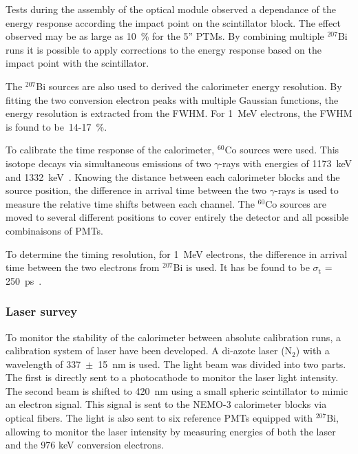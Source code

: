 \documentclass[main.tex]{subfiles}
\begin{document}
\bigskip


\NI Tests during the assembly of the optical module observed a dependance of the energy response according the impact point on the scintillator block. The effect observed may be as large as 10~\% for the 5'' PTMs. By combining multiple $^{\text{207}}$Bi runs it is possible to apply corrections to the energy response based on the impact point with the scintillator.


\bigskip


\NI The $^{\text{207}}$Bi sources are also used to derived the calorimeter energy resolution. By fitting the two conversion electron peaks with multiple Gaussian functions, the energy resolution is extracted from the FWHM. For 1~MeV electrons, the FWHM is found to be~14-17~\%. 
 
 
\bigskip


\NI To calibrate the time response of the calorimeter, $^{\text{60}}$Co sources were used. This isotope decays via simultaneous emissions of two $\gamma$-rays with energies of 1173~keV and 1332~keV~\cite{DecayCo60}. Knowing the distance between each calorimeter blocks and the source position, the difference in arrival time between the two $\gamma$-rays is used to measure the relative time shifts between each channel. The $^{\text{60}}$Co sources are moved to several different positions to cover entirely the detector and all possible combinaisons of PMTs.


\bigskip


\NI To determine the timing resolution, for 1~MeV electrons, the difference in arrival time between the two electrons from $^{\text{207}}$Bi is used. It has be found to be $\sigma_{\text{t}}$ = 250~ps~\cite{NEMO-3-detector}.

 
\subsubsection{Laser survey}


\NI To monitor the stability of the calorimeter between absolute calibration runs, a calibration system of laser have been developed. A di-azote laser (N$_\text{2}$) with a wavelength of 337~$\pm$~15~nm is used. The light beam was divided into two parts. The first is directly sent to a photocathode to monitor the laser light intensity. The second beam is shifted to 420~nm using a small spheric scintillator to mimic an electron signal. This signal is sent to the NEMO-3 calorimeter blocks via optical fibers. The light is also sent to six reference PMTs equipped with $^{\text{207}}$Bi, allowing to monitor the laser intensity by measuring energies of both the laser and the 976 keV conversion electrons.
\end{document}
